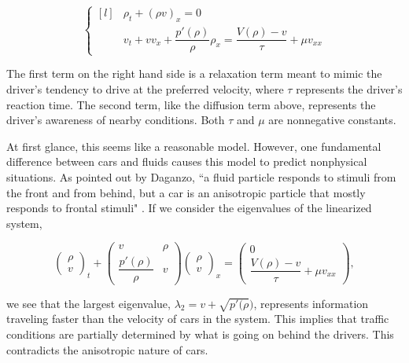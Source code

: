 \documentclass{article}
\begin{document}
\[ \left\{ \begin{matrix*}[l] & \rho_t + (\rho v)_x = 0 \\[1ex] & v_t + v v_x + \dfrac{p'(\rho)}{\rho} \rho_x = \dfrac{V(\rho) - v}{\tau} + \mu v_{xx} \end{matrix*} \right. \]

The first term on the right hand side is a relaxation term meant to mimic the driver's tendency to drive at the preferred velocity, where $\tau$ represents the driver's reaction time.  The second term, like the diffusion term above, represents the driver's awareness of nearby conditions.  Both $\tau$ and $\mu$ are nonnegative constants.  

At first glance, this seems like a reasonable model.  However, one fundamental difference between cars and fluids causes this model to predict nonphysical situations.  As pointed out by Daganzo, 	``a fluid particle responds to stimuli from the front and from behind, but a car is an anisotropic particle that mostly responds to frontal stimuli" \cite{Daganzo1995}.  If we consider the eigenvalues of the linearized system,

\[ \begin{pmatrix} \rho \\[1ex] v \end{pmatrix}_t + \begin{pmatrix} v & \rho \\[1ex] \dfrac{p'(\rho)}{\rho} & v \end{pmatrix} \begin{pmatrix} \rho \\[1ex] v \end{pmatrix}_x = \begin{pmatrix} 0 \\[1ex] \dfrac{V(\rho) - v}{\tau} + \mu v_{xx} \end{pmatrix}, \]

we see that the largest eigenvalue, $\lambda_2 = v + \sqrt{p'(\rho})$, represents information traveling faster than the velocity of cars in the system.  This implies that traffic conditions are partially determined by what is going on behind the drivers.  This contradicts the anisotropic nature of cars. 

\end{document}
